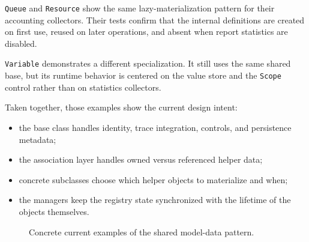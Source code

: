 \texttt{Queue} and \texttt{Resource} show the same lazy-materialization pattern for their
accounting collectors. Their tests confirm that the internal definitions are
created on first use, reused on later operations, and absent when report
statistics are disabled.

\texttt{Variable} demonstrates a different specialization. It still uses the same
shared base, but its runtime behavior is centered on the value store and the
\texttt{Scope} control rather than on statistics collectors.

Taken together, those examples show the current design intent:
\begin{itemize}
\item the base class handles identity, trace integration, controls, and
      persistence metadata;
\item the association layer handles owned versus referenced helper data;
\item concrete subclasses choose which helper objects to materialize and when;
\item the managers keep the registry state synchronized with the lifetime of
      the objects themselves.
\end{itemize}

\begin{figure}[htbp]
\centering
\caption{Concrete current examples of the shared model-data pattern.}
\label{fig:model-component-concrete-example}
\end{figure}


